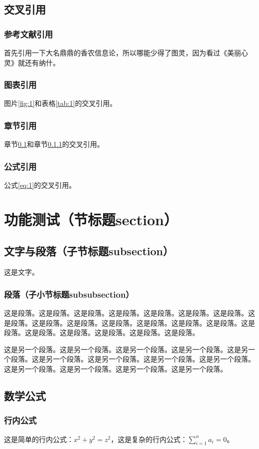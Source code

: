 \begin{ujnbody}
    \subsection{交叉引用}\label{sec:1}
    \subsubsection{参考文献引用}\label{sec:2}
    首先引用一下大名鼎鼎的香农信息论\cite{shannon1948mathematical}，所以哪能少得了图灵\cite{turing2009computing}，因为看过《美丽心灵》就还有纳什\cite{nash1996non}。
    \subsubsection{图表引用}
    图片\ref{fig:1}和表格\ref{tab:1}的交叉引用。
    \subsubsection{章节引用}
    章节\ref{sec:1}和章节\ref{sec:2}的交叉引用。
    \subsubsection{公式引用}
    公式\ref{eq:1}的交叉引用。
    \section{功能测试（节标题section）}
    \subsection{文字与段落（子节标题subsection）}
    这是文字。
    \subsubsection{段落（子小节标题subsubsection）}
    这是段落。这是段落。这是段落。这是段落。这是段落。这是段落。这是段落。这是段落。这是段落。这是段落。这是段落。这是段落。这是段落。这是段落。这是段落。这是段落。这是段落。这是段落。这是段落。这是段落。

    这是另一个段落。这是另一个段落。这是另一个段落。这是另一个段落。这是另一个段落。这是另一个段落。这是另一个段落。这是另一个段落。这是另一个段落。这是另一个段落。这是另一个段落。这是另一个段落。这是另一个段落。
    \subsection{数学公式}
    \subsubsection{行内公式}
    这是简单的行内公式：$x^2+y^2=z^2$，这是复杂的行内公式：$\sum_{i=1}^n a_i=0$。

\end{ujnbody}
